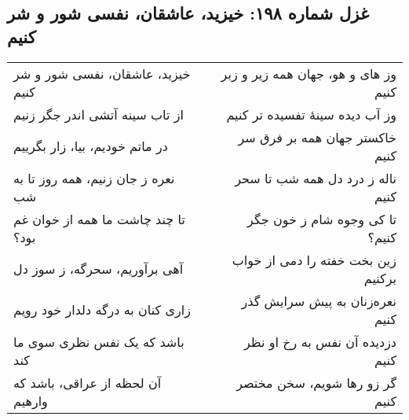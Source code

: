 \begin{center}
\section*{غزل شماره ۱۹۸: خیزید، عاشقان، نفسی شور و شر کنیم}
\label{sec:198}
\begin{longtable}{l p{0.5cm} r}
خیزید، عاشقان، نفسی شور و شر کنیم
&&
وز های و هو، جهان همه زیر و زبر کنیم
\\
از تاب سینه آتشی اندر جگر زنیم
&&
وز آب دیده سینهٔ تفسیده تر کنیم
\\
در ماتم خودیم، بیا، زار بگرییم
&&
خاکستر جهان همه بر فرق سر کنیم
\\
نعره ز جان زنیم، همه روز تا به شب
&&
ناله ز درد دل همه شب تا سحر کنیم
\\
تا چند چاشت ما همه از خوان غم بود؟
&&
تا کی وجوه شام ز خون جگر کنیم؟
\\
آهی برآوریم، سحرگه، ز سوز دل
&&
زین بخت خفته را دمی از خواب برکنیم
\\
زاری کنان به درگه دلدار خود رویم
&&
نعره‌زنان به پیش سرایش گذر کنیم
\\
باشد که یک نفس نظری سوی ما کند
&&
دزدیده آن نفس به رخ او نظر کنیم
\\
آن لحظه از عراقی، باشد که وارهیم
&&
گر زو رها شویم، سخن مختصر کنیم
\\
\end{longtable}
\end{center}
